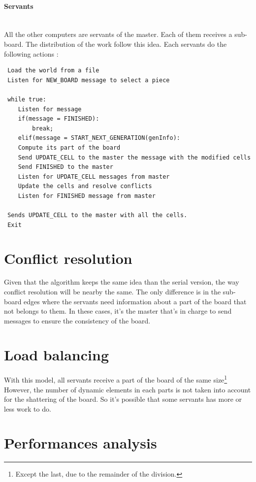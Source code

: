 \documentclass[a4paper,10pt]{article}
\begin{document}
\paragraph{Servants}
~\\

All the other computers are servants of the master. Each of them receives a sub-board. The distribution of the work follow this idea.
Each servants do the following actions :

\begin{lstlisting}
 Load the world from a file
 Listen for NEW_BOARD message to select a piece
 
 while true:
    Listen for message
    if(message = FINISHED):
		break;
    elif(message = START_NEXT_GENERATION(genInfo):
    Compute its part of the board
    Send UPDATE_CELL to the master the message with the modified cells
    Send FINISHED to the master
    Listen for UPDATE_CELL messages from master
    Update the cells and resolve conflicts
    Listen for FINISHED message from master
    
 Sends UPDATE_CELL to the master with all the cells.
 Exit
\end{lstlisting}

\section*{Conflict resolution}
Given that the algorithm keeps the same idea than the serial version, the way conflict resolution will be nearby the same. 
The only difference is in the sub-board edges where the servants need information about a part of the board that not belongs to them.
In these cases, it's the master that's in charge to send messages to ensure the consistency of the board.
\section*{Load balancing}
With this model, all servants receive a part of the board of the same size\footnote{Except the last, due to the remainder of the division.}
However, the number of dynamic elements in each parts is not taken into account for the shattering of the board. So it's possible
that some servants has more or less work to do.
\section*{Performances analysis}
\end{document}
